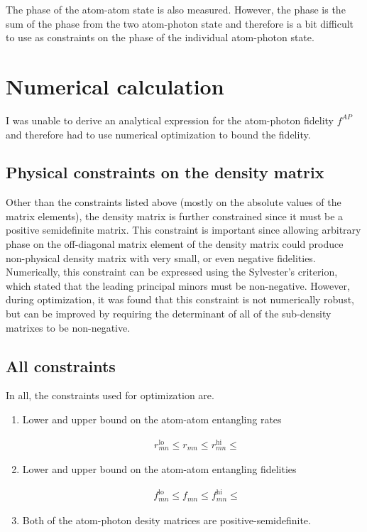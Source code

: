 \documentclass[10pt,fleqn]{article}
\newcommand{\eqar}[1]
{
  \begin{align}
    #1
  \end{align}
}
\begin{document}
The phase of the atom-atom state is also measured. However, the phase is the sum of the phase from the two atom-photon state and therefore is a bit difficult to use as constraints on the phase of the individual atom-photon state.

\section{Numerical calculation}
I was unable to derive an analytical expression for the atom-photon fidelity $f^{AP}$ and therefore had to use numerical optimization to bound the fidelity.

\subsection{Physical constraints on the density matrix}
Other than the constraints listed above (mostly on the absolute values of the matrix elements), the density matrix is further constrained since it must be a positive semidefinite matrix.
This constraint is important since allowing arbitrary phase on the off-diagonal matrix element of the density matrix could produce non-physical density matrix with very small, or even negative fidelities.
Numerically, this constraint can be expressed using the Sylvester's criterion, which stated that the leading principal minors must be non-negative.
However, during optimization, it was found that this constraint is not numerically robust, but can be improved by requiring the determinant of all of the sub-density matrixes to be non-negative.

\subsection{All constraints}
In all, the constraints used for optimization are.

\begin{enumerate}
\item Lower and upper bound on the atom-atom entangling rates
  \eqar{
    &r_{mn}^{\mathrm{lo}}\leqslant r_{mn} \leqslant r_{mn}^{\mathrm{hi}}\leqslant
  }
\item Lower and upper bound on the atom-atom entangling fidelities
  \eqar{
    &f_{mn}^{\mathrm{lo}}\leqslant f_{mn} \leqslant f_{mn}^{\mathrm{hi}}\leqslant
  }
\item Both of the atom-photon desity matrices are positive-semidefinite.
\end{enumerate}
\end{document}
